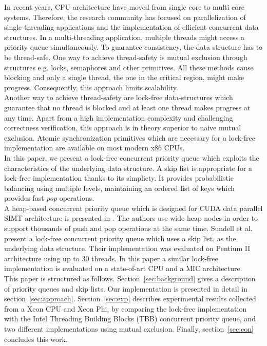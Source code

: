 In recent years, CPU architecture have moved from single core to multi core systems.
Therefore, the research community has focused on parallelization of single-threading applications and the implementation of efficient concurrent data structures.
In a multi-threading application, multiple threads might access a priority queue simultaneously.
To guarantee consistency, the data structure has to be thread-safe.
One way to achieve thread-safety is mutual exclusion through structures e.g. locks, semaphores and other primitives.
All these methods cause blocking and only a single thread, the one in the critical region, might make progress.
Consequently, this approach limits scalability.\\
Another way to achieve thread-safety are lock-free data-structures which guarantee that no thread is blocked and at least one thread makes progress at any time.
Apart from a high implementation complexity and challenging correctness verification, this approach is in theory superior to naive mutual exclusion.
Atomic synchronization primitives which are necessary for a lock-free implementation are available on most modern x86 CPUs.\\
In this paper, we present a lock-free concurrent priority queue which exploits the characteristics of the underlying data structure.
A skip list \cite{Pugh:1990:SLP:78973.78977} is appropriate for a lock-free implementation thanks to its simplicty.
It provides probabilistic balancing using multiple levels, maintaining an ordered list of keys which provides fast \textit{pop} operations.\\
A heap-based concurrent priority queue which is designed for CUDA data parallel SIMT architecture is presented in \cite{DBLP:conf/hipc/HeAP12}.
The authors use wide heap nodes in order to support thousands of push and pop operations at the same time.
Sundell et al.~\cite{Sundell:2005:FLC:1073765.1073770} present a lock-free concurrent priority queue which uses a skip list, as the underlying data structure. Their implementation was evaluated on Pentium II architecture using up to 30 threads. In this paper a similar lock-free implementation is evaluated on a state-of-art CPU and a MIC architecture.\\
This paper is structured as follows.
Section~\ref{sec:background} gives a description of priority queues and skip lists.
Our implementation is presented in detail in section~\ref{sec:approach}. Section~\ref{sec:exp} describes experimental results collected from a Xeon CPU and Xeon Phi, by comparing the lock-free implementation with the Intel Threading Building Blocks (TBB) concurrent priority queue, and two different implementations using mutual exclusion. Finally, section~\ref{sec:con} concludes this work.
